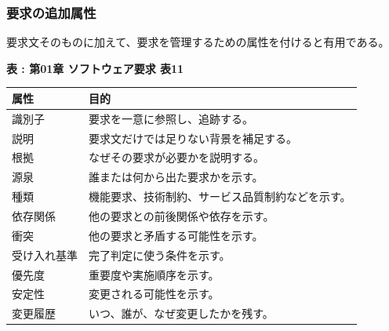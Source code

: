 \subsubsection{要求の追加属性}

要求文そのものに加えて、要求を管理するための属性を付けると有用である。

\par\smallskip\noindent{}\label{tab:ch01-11}\textbf{表 \thetable: 第01章 ソフトウェア要求 表11}\par\smallskip
\begin{tabularx}{0.97\linewidth}{@{}p{.25\linewidth}X@{}}
\toprule
属性 & 目的 \\
\midrule
識別子 & 要求を一意に参照し、追跡する。 \\
説明 & 要求文だけでは足りない背景を補足する。 \\
根拠 & なぜその要求が必要かを説明する。 \\
源泉 & 誰または何から出た要求かを示す。 \\
種類 & 機能要求、技術制約、サービス品質制約などを示す。 \\
依存関係 & 他の要求との前後関係や依存を示す。 \\
衝突 & 他の要求と矛盾する可能性を示す。 \\
受け入れ基準 & 完了判定に使う条件を示す。 \\
優先度 & 重要度や実施順序を示す。 \\
安定性 & 変更される可能性を示す。 \\
変更履歴 & いつ、誰が、なぜ変更したかを残す。 \\
\bottomrule
\end{tabularx}
